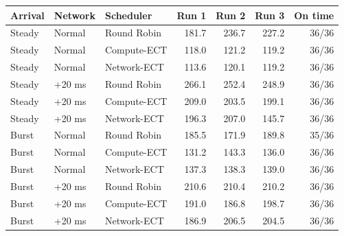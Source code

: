 \begin{table}[H]
\centering
\label{table:all-scenarios:start}
\begin{tabular}{lllrrrr}
\toprule
\textbf{Arrival} & \textbf{Network} & \textbf{Scheduler} & \textbf{Run 1} & \textbf{Run 2} & \textbf{Run 3} & \textbf{On time} \\
\midrule
Steady & Normal & Round Robin & 181.7 & 236.7 & 227.2 & 36/36 \\
Steady & Normal & Compute-ECT & 118.0 & 121.2 & 119.2 & 36/36 \\
Steady & Normal & Network-ECT & 113.6 & 120.1 & 119.2 & 36/36 \\
Steady & +20 ms & Round Robin & 266.1 & 252.4 & 248.9 & 36/36 \\
Steady & +20 ms & Compute-ECT & 209.0 & 203.5 & 199.1 & 36/36 \\
Steady & +20 ms & Network-ECT & 196.3 & 207.0 & 145.7 & 36/36 \\
Burst & Normal & Round Robin & 185.5 & 171.9 & 189.8 & 35/36 \\
Burst & Normal & Compute-ECT & 131.2 & 143.3 & 136.0 & 36/36 \\
Burst & Normal & Network-ECT & 137.3 & 138.3 & 139.0 & 36/36 \\
Burst & +20 ms & Round Robin & 210.6 & 210.4 & 210.2 & 36/36 \\
Burst & +20 ms & Compute-ECT & 191.0 & 186.8 & 198.7 & 36/36 \\
Burst & +20 ms & Network-ECT & 186.9 & 206.5 & 204.5 & 36/36 \\
\bottomrule
\end{tabular}
\label{table:all-scenarios:end}
\end{table}
